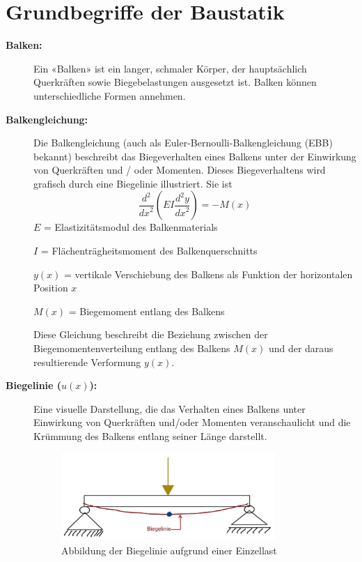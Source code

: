 %
%
%
%
\section{Grundbegriffe der Baustatik}
\label{balken:section:teil1}
\begin{description}
\item[\textbf{Balken:}] Ein «Balken» ist ein langer, schmaler Körper, der hauptsächlich Querkräften sowie Biegebelastungen ausgesetzt ist.
Balken können unterschiedliche Formen annehmen.

\item[\textbf{Balkengleichung:}] Die Balkengleichung (auch als Euler-Bernoulli-Balkengleichung (EBB) bekannt) beschreibt das Biegeverhalten eines Balkens unter der Einwirkung von Querkräften und / oder Momenten.
Dieses Biegeverhaltens wird grafisch durch eine Biegelinie illustriert. \cite{balken:Biegelinie} Sie ist
\begin{equation}
	\frac{d^2}{{dx}^2}\left(EI\frac{d^2y}{{dx}^2}\right)
	=-M(x)
\end{equation}
$E$ = Elastizitätsmodul des Balkenmaterials

$I$ = Flächenträgheitsmoment des Balkenquerschnitts

$y(x)$ = vertikale Verschiebung des Balkens als Funktion der horizontalen Position $x$

$M(x)$ = Biegemoment entlang des Balkens

Diese Gleichung beschreibt die Beziehung zwischen der Biegemomentenverteilung entlang des Balkens $M(x)$ und der daraus resultierende Verformung $y(x)$.

\item[\textbf{Biegelinie ($u(x)$):}] Eine visuelle Darstellung, die das Verhalten eines Balkens unter Einwirkung von Querkräften und/oder Momenten veranschaulicht und die Krümmung des Balkens entlang seiner Länge darstellt. \cite{balken:Biegelinie}
\begin{figure}
	\centering
	\includegraphics[width=0.8\textwidth]{papers/balken/images/teil1/Biegelinie1.jpg}
	\caption{Abbildung der Biegelinie aufgrund einer Einzellast}
	\label{fig:Abbildung der Biegelinie aufgrund einer Einzellast}
\end{figure}


\end{description}
